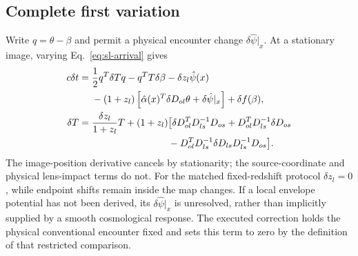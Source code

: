 \subsection{Complete first variation}
Write $q=\theta-\beta$ and permit a physical encounter change
$\delta\hat\psi|_x$. At a stationary image, varying
Eq.~\eqref{eq:sl-arrival} gives
\begin{align}
 c\delta t={}&\frac12q^T\delta Tq-q^TT\delta\beta
 -\delta z_l\hat\psi(x)\nonumber\\
 &-(1+z_l)\left[
 \hat\alpha(x)^T\delta D_{ol}\theta+\delta\hat\psi|_x\right]
 +\delta f(\beta),
 \label{eq:sl-complete-variation}\\
 \delta T={}&\frac{\delta z_l}{1+z_l}T
 +(1+z_l)\big[\delta D_{ol}^TD_{ls}^{-1}D_{os}
 +D_{ol}^TD_{ls}^{-1}\delta D_{os}\nonumber\\
 &\hspace{28mm}-D_{ol}^TD_{ls}^{-1}
 \delta D_{ls}D_{ls}^{-1}D_{os}\big].\nonumber
\end{align}
The image-position derivative cancels by stationarity;
the source-coordinate and physical lens-impact terms do not.
For the matched fixed-redshift protocol $\delta z_l=0$, while endpoint
shifts remain inside the map changes. If a local envelope potential has
not been derived, its $\delta\hat\psi|_x$ is unresolved, rather than
implicitly supplied by a smooth cosmological response. The executed
correction holds the physical conventional encounter fixed and sets this
term to zero by the definition of that restricted comparison.

